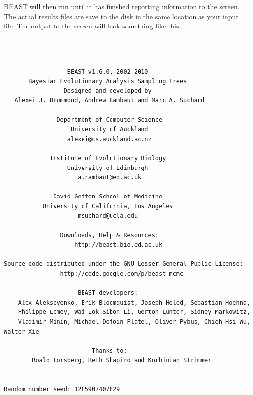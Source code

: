 \documentclass[12pt]{article}
\begin{document}
\medskip{}

BEAST will then run until it has finished
reporting information to the screen. The actual results files are
save to the disk in the same location as your input file. The output to the screen will
look something like this: 

{\scriptsize   
\begin{verbatim}



                  BEAST v1.6.0, 2002-2010
       Bayesian Evolutionary Analysis Sampling Trees
                 Designed and developed by
   Alexei J. Drummond, Andrew Rambaut and Marc A. Suchard
                              
               Department of Computer Science
                   University of Auckland
                  alexei@cs.auckland.ac.nz
                              
             Institute of Evolutionary Biology
                  University of Edinburgh
                     a.rambaut@ed.ac.uk
                              
              David Geffen School of Medicine
           University of California, Los Angeles
                     msuchard@ucla.edu
                              
                Downloads, Help & Resources:
                 	http://beast.bio.ed.ac.uk
                              
Source code distributed under the GNU Lesser General Public License:
            	http://code.google.com/p/beast-mcmc
                              
                     BEAST developers:
	Alex Alekseyenko, Erik Bloomquist, Joseph Heled, Sebastian Hoehna, 
	Philippe Lemey, Wai Lok Sibon Li, Gerton Lunter, Sidney Markowitz, 
	Vladimir Minin, Michael Defoin Platel, Oliver Pybus, Chieh-Hsi Wu, Walter Xie
                              
                         Thanks to:
    	Roald Forsberg, Beth Shapiro and Korbinian Strimmer


Random number seed: 1285907407029


\end{verbatim}}
\end{document}
